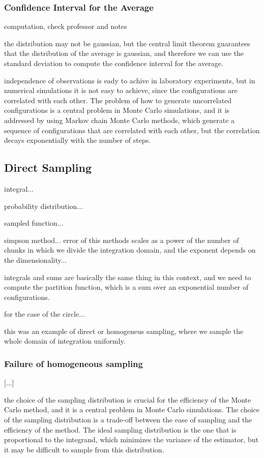 \subsubsection{Confidence Interval for the Average}

computation, check professor and notes

the distribution may not be gaussian, but the central limit theorem guarantees that the distribution of the average is gaussian, and therefore we can use the standard deviation to compute the confidence interval for the average.

independence of observations is eady to achive in laboratory experiments, but in numerical simulations it is not easy to achieve, since the configurations are correlated with each other. The problem of how to generate uncorrelated configurations is a central problem in Monte Carlo simulations, and it is addressed by using Markov chain Monte Carlo methods, which generate a sequence of configurations that are correlated with each other, but the correlation decays exponentially with the number of steps.

\subsection{Direct Sampling}

integral...

probability distribution...

sampled function...

simpson method... error of this methods scales as a power of the number of chunks in which we divide the integration domain, and the exponent depends on the dimensionality...

integrals and sums are basically the same thing in this context, and we need to compute the partition function, which is a sum over an exponential number of configurations.

for the case of the circle...

this was an example of direct or homogeneus sampling, where we sample the whole domain of integration uniformly.

\subsubsection{Failure of homogeneous sampling}

[...]

the choice of the sampling distribution is crucial for the efficiency of the Monte Carlo method, and it is a central problem in Monte Carlo simulations. The choice of the sampling distribution is a trade-off between the ease of sampling and the efficiency of the method. The ideal sampling distribution is the one that is proportional to the integrand, which minimizes the variance of the estimator, but it may be difficult to sample from this distribution.

